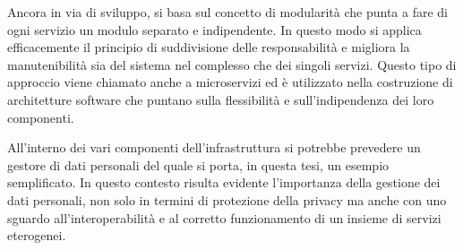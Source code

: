 Ancora in via di sviluppo, si basa sul concetto di modularit\`a che punta a fare di ogni servizio un modulo separato e indipendente. In questo modo si applica efficacemente il principio di suddivisione delle responsabilit\`a e migliora la manutenibilit\`a sia del sistema nel complesso che dei singoli servizi. Questo tipo di approccio viene chiamato anche a microservizi \cite{microservices} ed è utilizzato nella costruzione di architetture software che puntano sulla flessibilit\`a e sull'indipendenza dei loro componenti.

All’interno dei vari componenti dell’infrastruttura si potrebbe prevedere un gestore di dati personali del quale si porta, in questa tesi, un esempio semplificato. In questo contesto risulta evidente l’importanza della gestione dei dati personali, non solo in termini di protezione della privacy ma anche con uno sguardo all’interoperabilit\`a e al corretto funzionamento di un insieme di servizi eterogenei.
